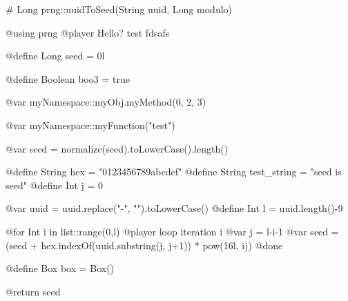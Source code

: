 \documentclass{article}
\begin{document}
    

\begin{msccode}
# Long prng::uuidToSeed(String uuid, Long modulo)

@using prng
@player Hello? test fdsafs

@define Long seed = 0l

@define Boolean boo3 = true

@var myNamespace::myObj.myMethod(0, 2, 3)

@var myNamespace::myFunction("test")

@var seed = normalize(seed).toLowerCase().length()

@define String hex = "0123456789abcdef"
@define String test_string = "seed is {{seed}}"
@define Int j = 0

@var uuid = uuid.replace("-", "").toLowerCase()
@define Int l = uuid.length()-9

@for Int i in list::range(0,l)
    @player loop iteration {{i}}
    @var j = l-i-1
    @var seed = (seed + hex.indexOf(uuid.substring(j, j+1)) * pow(16l, i)) %
@done

@define Box box = Box()

@return seed
\end{msccode}

\end{document}
